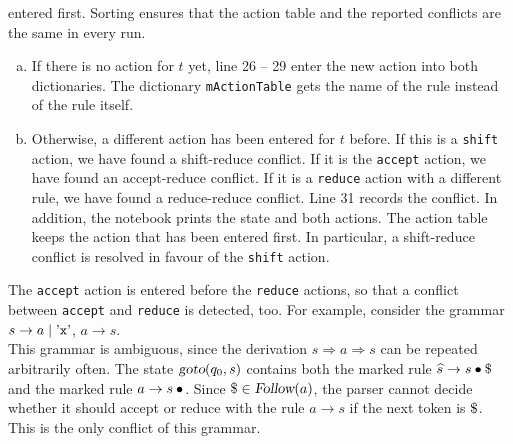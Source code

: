 \begin{enumerate}
      entered first.  Sorting ensures that the action table and the reported conflicts are the same in every run.
      \begin{enumerate}[(a)]
      \item If there is no action for $t$ yet, line 26 -- 29 enter the new action into both dictionaries.  The
            dictionary \texttt{mActionTable} gets the name of the rule instead of the rule itself.
      \item Otherwise, a different action has been entered for $t$ before.  If this is a \texttt{shift} action,
            we have found a shift-reduce conflict.  If it is the \texttt{accept} action,
            we have found an accept-reduce conflict.  If it is a \texttt{reduce} action with a different
            rule, we have found a reduce-reduce conflict.  Line 31 records the conflict.  In addition, the
            notebook prints the state and both actions.  The action table keeps the action that has been entered
            first.  In particular, a shift-reduce conflict is resolved in favour of the \texttt{shift} action.
      \end{enumerate}
      The \texttt{accept} action is entered before the \texttt{reduce} actions, so that a conflict between
      \texttt{accept} and \texttt{reduce} is detected, too.  For example, consider the grammar
      \\[0.2cm]
      \hspace*{1.3cm}
      $s \rightarrow a \mid \mbox{'\texttt{x}'}$, \quad $a \rightarrow s$.
      \\[0.2cm]
      This grammar is ambiguous, since the derivation $s \Rightarrow a \Rightarrow s$ can be repeated arbitrarily
      often.  The state $\textsl{goto}(q_0, s)$ contains both the marked rule
      $\widehat{s} \rightarrow s \mdot \symbol{36}$ and the marked rule $a \rightarrow s \mdot$.  Since
      $\symbol{36} \in \textsl{Follow}(a)$, the parser cannot decide whether it should accept or reduce with the
      rule $a \rightarrow s$ if the next token is $\symbol{36}$.  This is the only conflict of this grammar.
\end{enumerate}

